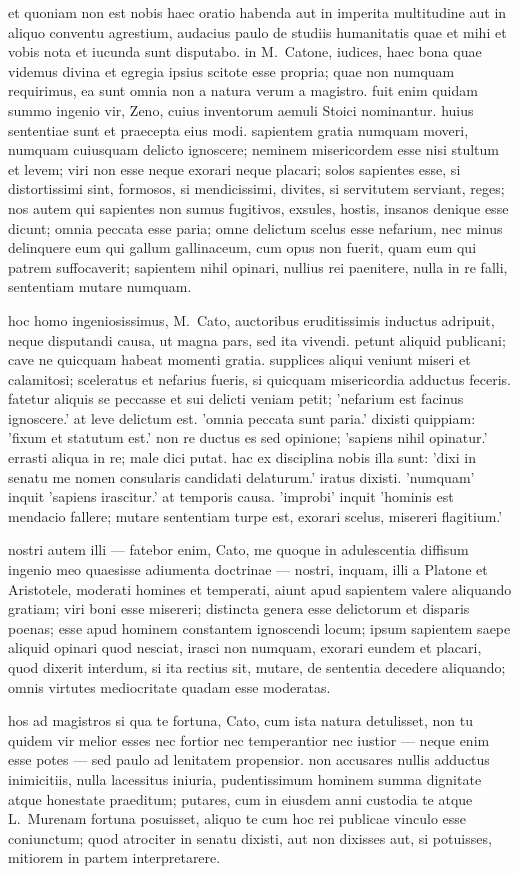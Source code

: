 
et quoniam non est nobis haec oratio habenda aut in imperita multitudine aut in aliquo conventu agrestium, audacius paulo de studiis humanitatis quae et mihi et vobis nota et iucunda sunt disputabo. in M.~Catone, iudices, haec bona quae videmus divina et egregia ipsius scitote esse propria; quae non numquam requirimus, ea sunt omnia non a natura verum a magistro. fuit enim quidam summo ingenio vir, Zeno, cuius inventorum aemuli Stoici nominantur. huius sententiae sunt et praecepta eius modi. sapientem gratia numquam moveri, numquam cuiusquam delicto ignoscere; neminem misericordem esse nisi stultum et levem; viri non esse neque exorari neque placari; solos sapientes esse, si distortissimi sint, formosos, si mendicissimi, divites, si servitutem serviant, reges; nos autem qui sapientes non sumus fugitivos, exsules, hostis, insanos denique esse dicunt; omnia peccata esse paria; omne delictum scelus esse nefarium, nec minus delinquere eum qui gallum gallinaceum, cum opus non fuerit, quam eum qui patrem suffocaverit; sapientem nihil opinari, nullius rei paenitere, nulla in re falli, sententiam mutare numquam.


hoc homo ingeniosissimus, M.~Cato, auctoribus eruditissimis inductus adripuit, neque disputandi causa, ut magna pars, sed ita vivendi. petunt aliquid publicani; cave ne quicquam habeat momenti gratia. supplices aliqui veniunt miseri et calamitosi; sceleratus et nefarius fueris, si quicquam misericordia adductus feceris. fatetur aliquis se peccasse et sui delicti veniam petit; 'nefarium est facinus ignoscere.' at leve delictum est. 'omnia peccata sunt paria.' dixisti quippiam: 'fixum et statutum est.' non re ductus es sed opinione; 'sapiens nihil opinatur.' errasti aliqua in re; male dici putat. hac ex disciplina nobis illa sunt: 'dixi in senatu me nomen consularis candidati delaturum.' iratus dixisti. 'numquam' inquit 'sapiens irascitur.' at temporis causa. 'improbi' inquit 'hominis est mendacio fallere; mutare sententiam turpe est, exorari scelus, misereri flagitium.'

nostri autem illi — fatebor enim, Cato, me quoque in adulescentia diffisum ingenio meo quaesisse adiumenta doctrinae — nostri, inquam, illi a Platone et Aristotele, moderati homines et temperati, aiunt apud sapientem valere aliquando gratiam; viri boni esse misereri; distincta genera esse delictorum et disparis poenas; esse apud hominem constantem ignoscendi locum; ipsum sapientem saepe aliquid opinari quod nesciat, irasci non numquam, exorari eundem et placari, quod dixerit interdum, si ita rectius sit, mutare, de sententia decedere aliquando; omnis virtutes mediocritate quadam esse moderatas.

hos ad magistros si qua te fortuna, Cato, cum ista natura detulisset, non tu quidem vir melior esses nec fortior nec temperantior nec iustior — neque enim esse potes — sed paulo ad lenitatem propensior. non accusares nullis adductus inimicitiis, nulla lacessitus iniuria, pudentissimum hominem summa dignitate atque honestate praeditum; putares, cum in eiusdem anni custodia te atque L.~Murenam fortuna posuisset, aliquo te cum hoc rei publicae vinculo esse coniunctum; quod atrociter in senatu dixisti, aut non dixisses aut, si potuisses, mitiorem in partem interpretarere.
